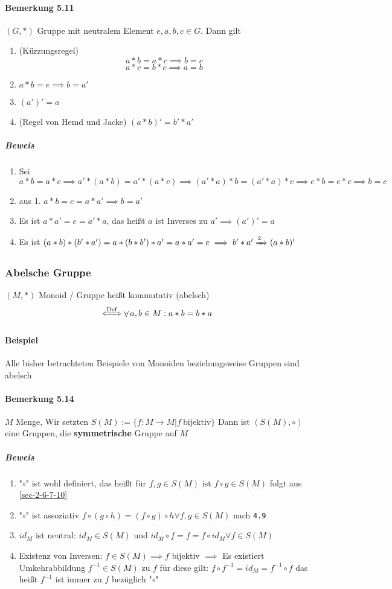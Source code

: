 \documentclass[a4paper]{scrartcl}
\DeclareMathOperator{\Forall}{\forall}
\theoremstyle{definition}
\theoremstyle{plain}
\theoremstyle{plain}
\theoremstyle{remark}
\theoremstyle{remark}
\theoremstyle{remark}
\theoremstyle{remark}
\theoremstyle{remark}
\begin{document}
\paragraph{Bemerkung 5.11}
\label{sec-3-1-4-2}
$(G,*)$ Gruppe mit neutralem Element $e,a,b,c \in G$. Dann gilt
\begin{enumerate}
\item (Kürzungsregel) \[a*b = a*c \implies b = c\] \[a*c = b * c \implies a = b\]
\item $a*b = e \implies b = a'$
\item $(a')' = a$
\item (Regel von Hemd und Jacke) $(a*b)' = b' * a'$
\end{enumerate}
\subparagraph{Beweis}
\label{sec-3-1-4-2-1}
\begin{enumerate}
\item Sei $a * b = a * c \implies a'*(a*b) = a'*(a*c) \implies (a'*a)*b=(a'*a)*c \implies e*b = e*c \implies b = c$
\item aus 1. $a*b = c = a*a' \implies b = a'$
\item Es ist $a*a' = e = a' * a$, das heißt $a$ ist Inverses zu $a' \implies (a')' = a$
\item Es ist $(a*b)*(b'*a') = a*(b*b')*a' = a*a' = e \implies b' * a' \xRightarrow{\text{2.}} (a *b)'$
\end{enumerate}
\subsubsection{Abelsche Gruppe}
\label{sec-3-1-5}
$(M,*)$ Monoid / Gruppe heißt kommutativ (abelsch)
\[\xLeftrightarrow{\text{Def}} \Forall a,b\in M: a*b = b*a\]
\paragraph{Beispiel}
\label{sec-3-1-5-1}
Alle bisher betrachteten Beispiele von Monoiden beziehungsweise Gruppen sind abelsch
\paragraph{Bemerkung 5.14}
\label{sec-3-1-5-2}
$M$ Menge, Wir setzten $S(M):= \{f:M\to M | f~\text{bijektiv}\}$
Dann ist $(S(M),\circ)$ eine Gruppen, die \textbf{symmetrische} Gruppe auf $M$
\subparagraph{Beweis}
\label{sec-3-1-5-2-1}
\begin{enumerate}
\item "$\circ$" ist wohl definiert, das heißt für $f,g\in S(M)$ ist $f\circ g \in S(M)$ folgt aus \ref{sec-2-6-7-10}
\item "$\circ$" ist assoziativ $f\circ(g\circ h) = (f\circ g) \circ h \Forall f,g\in S(M)$ nach \texttt{4.9}
\item $id_M$ ist neutral: $id_M \in S(M)$ und $id_M\circ f = f = f\circ id_M \Forall f\in S(M)$
\item Existenz von Inversen: $f\in S(M) \implies f$ bijektiv $\implies$ Es existiert Umkehrabbildung $f^{-1}\in S(M)$ zu $f$
                 für diese gilt: $f\circ f^{-1} = id_M = f^{-1}\circ f$ das heißt $f^{-1}$ ist immer zu $f$ bezüglich "$\circ$"
\end{enumerate}
\end{document}
